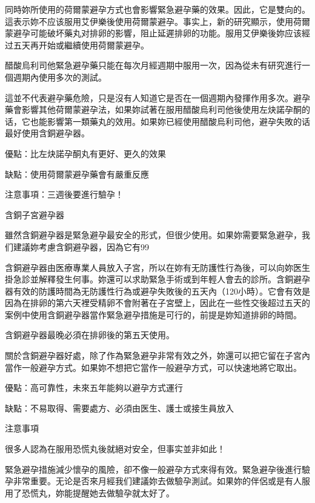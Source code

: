 \documentclass[12pt,UTF8]{ctexbook}
\begin{document}
同時妳所使用的荷爾蒙避孕方式也會影響緊急避孕藥的效果。因此，它是雙向的。這表示妳不应该服用艾伊樂後使用荷爾蒙避孕。事实上，新的研究顯示，使用荷爾蒙避孕可能破坏藥丸对排卵的影響，阻止延遲排卵的功能。服用艾伊樂後妳应该經过五天再开始或繼續使用荷爾蒙避孕。

醋酸烏利司他緊急避孕藥只能在每次月經週期中服用一次，因為從未有研究進行一個週期內使用多次的測試。

這並不代表避孕藥危險，只是沒有人知道它是否在一個週期內發揮作用多次。避孕藥會影響其他荷爾蒙避孕法，如果妳試著在服用醋酸烏利司他後使用左炔諾孕酮的话，它也能影響第一類藥丸的效用。如果妳已經使用醋酸烏利司他，避孕失敗的话最好使用含銅避孕器。



優點：比左炔諾孕酮丸有更好、更久的效果

缺點：使用荷爾蒙避孕藥會有嚴重反應

注意事項：三週後要進行驗孕！





含銅子宮避孕器




雖然含銅避孕器是緊急避孕最安全的形式，但很少使用。如果妳需要緊急避孕，我们建議妳考慮含銅避孕器，因為它有99%

含銅避孕器由医療專業人員放入子宮，所以在妳有无防護性行為後，可以向妳医生掛急診並解釋發生何事。妳還可以求助緊急手術或到年輕人會去的診所。含銅避孕器有效的防護時間為无防護性行為或避孕失敗後的五天內（120小時）。它會有效是因為在排卵的第六天裡受精卵不會附著在子宮壁上，因此在一些性交後超过五天的案例中使用含銅避孕器當作緊急避孕措施是可行的，前提是妳知道排卵的時間。

含銅避孕器最晚必須在排卵後的第五天使用。

關於含銅避孕器好處，除了作為緊急避孕非常有效之外，妳還可以把它留在子宮內當作一般避孕方式。如果妳不想把它當作一般避孕方式，可以快速地將它取出。



優點：高可靠性，未來五年能夠以避孕方式運行

缺點：不易取得、需要處方、必須由医生、護士或接生員放入





注意事項




很多人認為在服用恐慌丸後就絕对安全，但事实並非如此！

緊急避孕措施減少懷孕的風險，卻不像一般避孕方式來得有效。緊急避孕後進行驗孕非常重要。无论是否來月經我们建議妳去做驗孕測試。如果妳的伴侶或是有人服用了恐慌丸，妳能提醒她去做驗孕就太好了。
\end{document}
